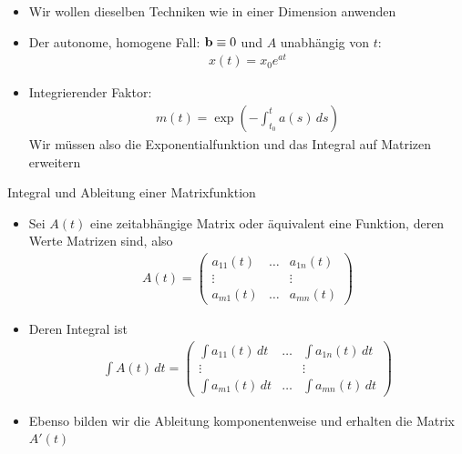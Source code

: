 \begin{frame}
  \begin{itemize}
  \item Wir wollen dieselben Techniken wie in einer Dimension anwenden
  \item Der autonome, homogene Fall: $\mathbf{b}\equiv 0$ und $A$ unabhängig von $t$:
    \begin{gather*}
      x(t) = x_0 e^{at}
    \end{gather*}
  \item Integrierender Faktor:
    \begin{gather*}
      m(t) = \exp\left(-\int_{t_0}^t a(s)\,ds\right)
    \end{gather*}
    Wir müssen also die Exponentialfunktion und das Integral auf Matrizen erweitern
  \end{itemize}
\end{frame}

\begin{frame}{Integral und Ableitung einer Matrixfunktion}
  \begin{itemize}
  \item Sei $A(t)$ eine zeitabhängige Matrix oder äquivalent eine Funktion, deren Werte Matrizen sind, also
    \begin{gather*}
      A(t) =
      \begin{pmatrix}
        a_{11}(t) &\dots& a_{1n}(t)\\
        \vdots && \vdots\\
        a_{m1}(t) & \dots &a_{mn}(t)
      \end{pmatrix}
    \end{gather*}
  \item Deren Integral ist
    \begin{gather*}
      \int A(t)\,dt =
      \begin{pmatrix}
        \int a_{11}(t)\,dt &\dots&\int a_{1n}(t)\,dt\\
        \vdots && \vdots\\
        \int a_{m1}(t)\,dt & \dots &\int a_{mn}(t)\,dt
      \end{pmatrix}
    \end{gather*}
  \item Ebenso bilden wir die Ableitung komponentenweise und erhalten die Matrix $A'(t)$
  \end{itemize}
\end{frame}

